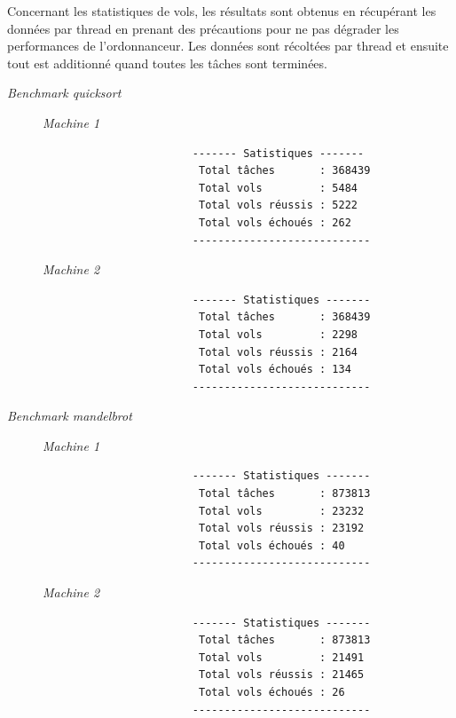 \documentclass[a4paper]{article}
\def\mone{\textit{Machine 1}} %
\def\mtwo{\textit{Machine 2}} %
\def\bone{\textit{Benchmark quicksort}}
\def\btwo{\textit{Benchmark mandelbrot}}
\begin{document}
Concernant les statistiques de vols, les résultats sont obtenus en récupérant
les données par thread en prenant des précautions pour ne pas dégrader les
performances de l'ordonnanceur. Les données sont récoltées par thread et ensuite
tout est additionné quand toutes les tâches sont terminées.

\begin{description}
  \item[\bone] \hspace{1em}
        \begin{description}
          \item[\mone] \hspace{1em}
                \begin{verbatim}
                  ------- Satistiques -------
                   Total tâches       : 368439
                   Total vols         : 5484
                   Total vols réussis : 5222
                   Total vols échoués : 262
                  ----------------------------
                \end{verbatim}
          \item[\mtwo] \hspace{1em}
                \begin{verbatim}
                  ------- Statistiques -------
                   Total tâches       : 368439
                   Total vols         : 2298
                   Total vols réussis : 2164
                   Total vols échoués : 134
                  ----------------------------
                \end{verbatim}
        \end{description}

  \item[\btwo] \hspace{1em}
        \begin{description}
          \item[\mone] \hspace{1em}
                \begin{verbatim}
                  ------- Statistiques -------
                   Total tâches       : 873813
                   Total vols         : 23232
                   Total vols réussis : 23192
                   Total vols échoués : 40
                  ----------------------------
                \end{verbatim}
          \item[\mtwo] \hspace{1em}
                \begin{verbatim}
                  ------- Statistiques -------
                   Total tâches       : 873813
                   Total vols         : 21491
                   Total vols réussis : 21465
                   Total vols échoués : 26
                  ----------------------------
                \end{verbatim}
        \end{description}
\end{description}
\end{document}
